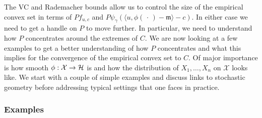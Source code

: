 \documentclass[10pt]{amsart}
\theoremstyle{definition}\newtheorem{defi}[theo]{Definition}\newtheorem{rema}[theo]{Remark}\newtheorem{exam}[theo]{Example}\newtheorem{exem}[theo]{Example}\newtheorem{nota}[theo]{Notation}
\theoremstyle{remark}
\newcommand{\X}{\mathcal{X}}
\newcommand{\cH}{\mathcal{H}}
\newcommand{\mean}{\mathfrak{m}}
\renewcommand*{\to}{\mathchoice{\longrightarrow}{\rightarrow}{\rightarrow}{\rightarrow}}
\begin{document}
The VC and Rademacher bounds allow us to control the size of the empirical convex set in terms of $P f_{u,c}$ and $P \psi_\gamma(\langle u,\phi(\,\cdot\,) - \mean \rangle -c)$. In either case we need to get a handle on $P$ to move further. In particular, we need to understand how $P$ concentrates around the extremes of $C$. We are now looking at a few examples to get a better understanding of how $P$ concentrates and what this implies for the convergence of the empirical convex set to $C$. Of major importance is how smooth $\phi: \X \to \cH$ is and how the distribution of $X_1,\dots, X_n$ on $\X$ looks like. We start with a couple of simple examples and discuss links to stochastic geometry before addressing typical settings that one faces in practice.



\subsubsection{Examples} 
\end{document}
